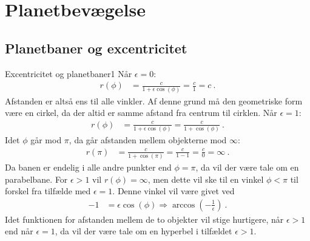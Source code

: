 \chapter{Planetbevægelse}
%
%
\section*{Planetbaner og excentricitet}
%
%
\begin{opgave}{Excentricitet og planetbaner}{1}
\opg Når $\epsilon = 0$:
\begin{align*}
	r(\phi) &= \frac{c}{1+\epsilon\cos(\phi)} = \frac{c}{1} = c \: .
\end{align*}
Afstanden er altså ens til alle vinkler. Af denne grund må den geometriske form være en cirkel, da der altid er samme afstand fra centrum til cirklen.
\opg Når $\epsilon = 1$:
\begin{align*}
	r(\phi) &= \frac{c}{1+\epsilon\cos(\phi)} = \frac{c}{1+\cos(\phi)} \: .
\end{align*}
Idet $\phi$ går mod $\pi$, da går afstanden mellem objekterne mod $\infty$:
\begin{align*}
	r(\pi) &= \frac{c}{1+\cos(\pi)} = \frac{c}{1-1} = \frac{c}{0} = \infty \: .
\end{align*}
Da banen er endelig i alle andre punkter end $\phi = \pi$, da vil der være tale om en parabelbane.
\opg For $\epsilon > 1$ vil $r(\phi) = \infty$, men dette vil ske til en vinkel $\phi < \pi$ til forskel fra tilfælde med $\epsilon = 1$. Denne vinkel vil være givet ved
\begin{align*}
	-1 &= \epsilon\cos(\phi) \Rightarrow \arccos\left(-\frac{1}{\epsilon}\right) \: .
\end{align*}
Idet funktionen for afstanden mellem de to objekter vil stige hurtigere, når $\epsilon > 1$ end når $\epsilon = 1$, da vil der være tale om en hyperbel i tilfældet $\epsilon > 1$.
\end{opgave}
%
%
